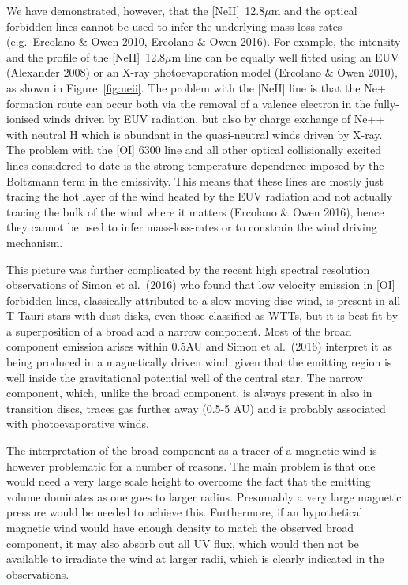 \documentclass[10pt,fleqn,twoside]{article}
\begin{document}
We have demonstrated, however, that the  [NeII]~12.8$\mu$m and the
optical forbidden lines 
cannot be used to infer the underlying 
mass-loss-rates (e.g.\ Ercolano \& Owen 2010, Ercolano \& Owen 2016). 
 For example, the intensity and the profile of the [NeII]~12.8$\mu$m line
 can be equally well fitted using an EUV (Alexander 2008) or an X-ray
 photoevaporation model (Ercolano \& Owen 2010), as shown in
 Figure~\ref{fig:neii}. The problem with the 
 [NeII] line is that the Ne+ formation route can occur both via the
 removal of a valence electron in the fully-ionised winds driven by
 EUV radiation, but also by charge exchange of Ne++ with neutral H
 which is abundant in the quasi-neutral winds driven by X-ray. 
The problem with the [OI] 6300 line and all other optical collisionally
excited lines considered to date is the strong temperature dependence
imposed by the Boltzmann term in the emissivity. This means that these
lines are mostly just tracing the hot layer of the wind heated by the
EUV radiation and not actually tracing the bulk of the wind where it
matters (Ercolano \& Owen 2016), hence they
cannot be used to infer mass-loss-rates or to constrain the wind
driving mechanism.   

This picture was further complicated by the recent high spectral
resolution observations of  Simon et al.\ (2016)  who found that low velocity
emission in [OI] forbidden lines, classically attributed to a
slow-moving disc wind, is present in all T-Tauri stars with
dust disks, even those classified as WTTs, but it is best fit
by a superposition of a broad and a narrow component. 
Most of the broad component emission
arises within 0.5AU and Simon et al.\ (2016) interpret it
as being produced in a magnetically driven wind, given that the
emitting region is well inside the gravitational 
potential well 
of the central star. The narrow component, which, unlike the broad
component, is always present in also in transition
discs, traces gas further away (0.5-5 AU) and is probably associated
with photoevaporative winds.

The interpretation of the broad component as a tracer of a magnetic
wind is however problematic for a number of reasons. The main problem
is that one would need a very large scale height to overcome the fact
that the emitting volume dominates as one goes to larger
radius. Presumably a very large magnetic pressure would be needed to
achieve this. Furthermore, if an hypothetical magnetic wind would
have enough density to match the observed broad component, it may also absorb
out all UV flux, which would then not be available to irradiate the
wind at larger radii, which is clearly indicated in the
observations. 
\end{document}
